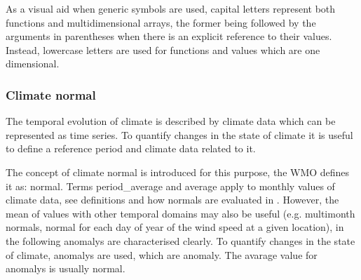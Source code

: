 As a visual aid when generic symbols are used, capital letters represent both functions and multidimensional arrays, the former being followed by the arguments in parentheses when there is an explicit reference to their values. Instead, lowercase letters are used for functions and values which are one dimensional.



\subsubsection{Climate normal}
The temporal evolution of climate is described by climate data which can be represented as time series. To quantify changes in the state of climate it is useful to define a reference period and climate data related to it.

The concept of climate \gls{normal} is introduced for this purpose, the \gls{WMO} defines it as: \glsdesc{normal}. Terms \Gls{period_average} and \gls{average} apply to monthly values of climate data, see definitions and how \glspl{normal} are evaluated in \cite[5-6]{2017WorldMeteorologicalOrganizationWMOWMOGuidelines}. However, the mean of values with other temporal domains may also be useful (e.g. multimonth \glspl{normal}, normal for each day of year of the wind speed at a given location), in the following \glspl{anomaly} are characterised clearly.
To quantify changes in the state of climate, \glspl{anomaly} are used, which are \glsdesc{anomaly}. The avarage value for \glspl{anomaly} is usually \gls{normal}.

